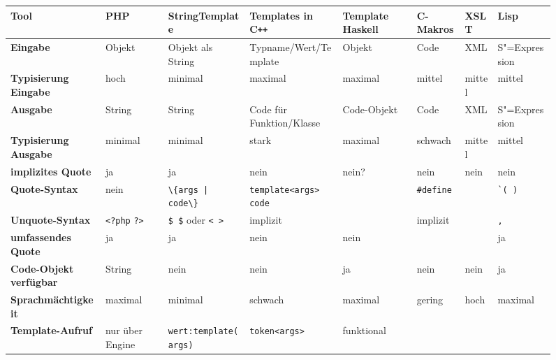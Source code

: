 \documentclass[a4paper, bibgerm]{book}
\newcommand\icode[1]{\lstinline?#1?}
\newcommand\phpo{\lstinline+<?php+}
\newcommand\phpc{\lstinline+?>+}
\newcommand{\sexp}{S"=Expression}
\newcommand{\cpp}{C\texttt{++}}
\begin{document}
\begin{figure}
  \centering
\begin{tabular}{|l|l|l|l|l|l|l|l|} \hline
\bf Tool             &\bf PHP        &\bf StringTemplate          &\bf Templates in \cpp{}    &\bf Template Haskell&\bf C-Makros&\bf XSLT &\bf Lisp        \\\hline\hline
\bf Eingabe              &Objekt         &Objekt als String           &Typname/Wert/Template     &Objekt          &Code            &XML      &\sexp{}     \\\hline
\bf Typisierung Eingabe  &hoch           &minimal                     &maximal                    &maximal         &mittel          &mittel   &mittel      \\\hline
\bf Ausgabe              &String         &String                      &Code für Funktion/Klasse   &Code-Objekt     &Code            &XML      &\sexp{}     \\\hline
\bf Typisierung Ausgabe  &minimal        &minimal                     &stark                      &maximal         &schwach         &mittel   &mittel      \\\hline
\bf implizites Quote     &ja             &ja                          &nein                       &nein?           &nein            &nein     &nein        \\\hline
\bf Quote-Syntax         &nein           &\icode{\{args | code\}}     &\icode{template<args> code}&                &\icode{#define} &         &\icode{`( )}\\\hline
\bf Unquote-Syntax       &\phpo{} \phpc{}&\icode{$ $} oder \icode{< >}&implizit                   &                &implizit        &         &\icode{,}   \\\hline
\bf umfassendes Quote    &ja             &ja                          &nein                       &nein            &                &         &ja          \\\hline
\bf Code-Objekt verfügbar&String         &nein                        &nein                       &ja              &nein            &nein     &ja          \\\hline
\bf Sprachmächtigkeit    &maximal        &minimal                     &schwach                    &maximal         &gering          &hoch     &maximal     \\\hline
\bf Template-Aufruf      &nur über Engine&\icode{wert:template(args)} &\icode{token<args>}        &funktional      &                &         &            \\\hline

\end{tabular}
\end{figure}
\end{document}
